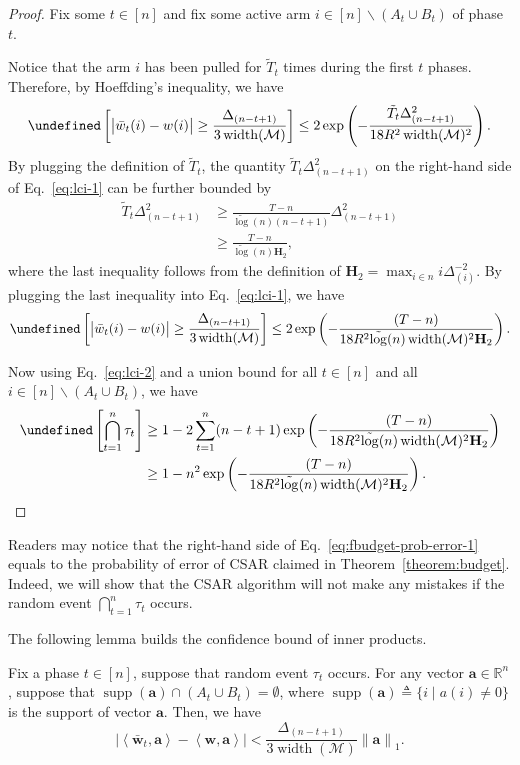 \documentclass{article}
\newcommand{\AlgorithmBud}{{\small \textsf{CSAR}}\xspace}
\newcommand{\M}{\mathcal M}
\newcommand{\del}{\backslash}
\newcommand{\RR}{\mathbb R}
\DeclareMathOperator{\supp}{supp}
\DeclareMathOperator{\rank}{width}
\newcommand{\barlog}{\tilde{\log}}
\let\Pr\undefined
\DeclareMathOperator{\Pr}{Pr}
\newcommand{\inn}[1]{\left\langle #1 \right\rangle}
\newcommand{\nor}[1]{\left\|#1\right\|}
\renewcommand{\vec}[1]{\boldsymbol{#1}}
\begin{document}
\begin{proof}
Fix some $t\in [n]$ and fix some active arm $i\in [n]\del (A_t\cup B_t)$ of phase $t$.

Notice that the arm $i$ has been pulled for $\tilde T_t$ times during the first $t$ phases.
Therefore,
by Hoeffding's inequality, we have
\begin{align}
	\Pr\left[ \big|\bar w_t(i)-w(i)\big| \ge \frac{\Delta_{(n-t+1)}}{3\rank(\M)} \right] \le
	2\exp\left(-\frac{\tilde T_t \Delta_{(n-t+1)}^2}{18 R^2\rank(\M)^2} \right).
	\label{eq:lci-1}
\end{align}
By plugging the definition of $\tilde T_t$, the quantity $\tilde T_t\Delta_{(n-t+1)}^2$ on the right-hand side of Eq.~\eqref{eq:lci-1} can be further bounded by
\begin{align*}
\tilde T_t\Delta_{(n-t+1)}^2 
&\ge \frac{T-n}{\barlog(n)(n-t+1)}\Delta_{(n-t+1)}^2\\
&\ge \frac{T-n}{\barlog(n) \mathbf H_2},
\end{align*}
where the last inequality follows from the definition of $\mathbf H_2=\max_{i\in n} i\Delta_{(i)}^{-2}$.
By plugging the last inequality into Eq.~\eqref{eq:lci-1}, we have
\begin{equation}
\label{eq:lci-2}
	\Pr\left[ \big|\bar w_t(i)-w(i)\big| \ge \frac{\Delta_{(n-t+1)}}{3\rank(\M)} \right] \le
	2\exp\left(-\frac{(T-n)}{18 R^2 \barlog(n) \rank(\M)^2 \mathbf H_2} \right).
\end{equation}

Now using Eq.~\eqref{eq:lci-2} and a union bound for all $t \in [n]$ and all $i\in[n]\del (A_t\cup B_t)$, we have
\begin{align*}
\Pr\left[\bigcap_{t=1}^n \tau_t\right] &
\ge 1-2\sum_{t=1}^n (n-t+1)\exp\left(-\frac{(T-n)}{18 R^2 \barlog(n) \rank(\M)^2 \mathbf H_2} \right)\\
&\ge 1-n^2  \exp\left(-\frac{(T-n)}{18 R^2 \barlog(n) \rank(\M)^2 \mathbf H_2} \right).
\end{align*}
\end{proof}

Readers may notice that the right-hand side of Eq.~\eqref{eq:fbudget-prob-error-1} equals to the probability of error of \AlgorithmBud claimed in Theorem~\ref{theorem:budget}. 
Indeed, we will show that the \AlgorithmBud algorithm will not make any mistakes if the random event $\bigcap_{t=1}^n \tau_t$ occurs.

The following lemma builds the confidence bound of inner products.
\begin{lemma}
Fix a phase $t\in[n]$, suppose that random event $\tau_t$ occurs.
For any vector $\vec a \in \RR^n$, suppose that $\supp(\vec a) \cap (A_t\cup B_t) = \emptyset$, where 
$\supp(\vec a) \triangleq \{i\;|\; a(i) \not=0\}$ is the support of vector $\vec a$.
Then, we have
$$
\left| \inn{\vec{\bar w}_t, \vec a} - \inn{\vec w, \vec a} \right|
< \frac{\Delta_{(n-t+1)}}{3\rank(\M)} \nor{\vec a}_1.
$$
\label{lemma:fbudget:ciproerty}
\end{lemma}
\end{document}
